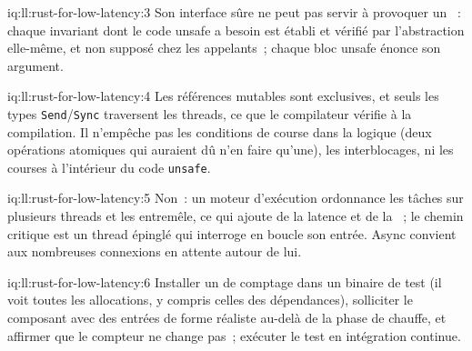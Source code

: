 \begin{solution}{iq:ll:rust-for-low-latency:3}
Son interface sûre ne peut pas servir à provoquer un ~: chaque invariant dont le code unsafe a besoin est établi et
vérifié par l'abstraction elle-même, et non supposé chez les appelants~; chaque bloc unsafe énonce son argument.
\end{solution}

\begin{solution}{iq:ll:rust-for-low-latency:4}
Les références mutables sont exclusives, et seuls les types \texttt{Send}/\texttt{Sync} traversent les threads, ce que le compilateur vérifie à la compilation. Il n'empêche pas
les conditions de course dans la logique (deux opérations atomiques qui auraient dû n'en faire qu'une), les interblocages, ni les courses
à l'intérieur du code \texttt{unsafe}.
\end{solution}

\begin{solution}{iq:ll:rust-for-low-latency:5}
Non~: un moteur d'exécution ordonnance les tâches sur plusieurs threads et les entremêle, ce qui ajoute de la latence et de la ~;
le chemin critique est un thread épinglé qui interroge en boucle son entrée. Async convient aux nombreuses connexions en attente autour de lui.
\end{solution}

\begin{solution}{iq:ll:rust-for-low-latency:6}
Installer un  de comptage dans un binaire de test (il voit toutes les allocations, y compris celles des
dépendances), solliciter le composant avec des entrées de forme réaliste au-delà de la phase de chauffe, et affirmer que le compteur
ne change pas~; exécuter le test en intégration continue.
\end{solution}
